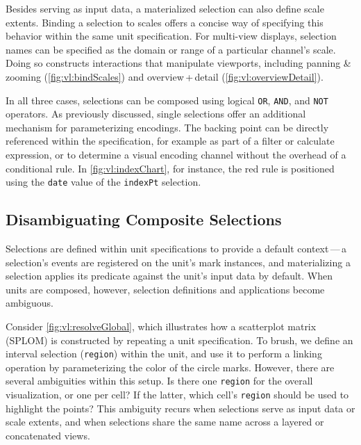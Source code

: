 Besides serving as input data, a materialized selection can also define scale
extents. Binding a selection to scales offers a concise way of specifying this
behavior within the same unit specification. For multi-view displays, selection
names can be specified as the domain or range of a particular channel's scale.
Doing so constructs interactions that manipulate viewports, including panning \&
zooming (\cref{fig:vl:bindScales}) and overview\,+\,detail
(\cref{fig:vl:overviewDetail}).

In all three cases, selections can be composed using logical \texttt{OR},
\texttt{AND}, and \texttt{NOT} operators. As previously discussed, single
selections offer an additional mechanism for parameterizing encodings. The
backing point can be directly referenced within the specification, for example
as part of a filter or calculate expression, or to determine a visual encoding
channel without the overhead of a conditional rule. In \cref{fig:vl:indexChart},
for instance, the red rule is positioned using the \texttt{date} value of the
\texttt{indexPt} selection.

\vspace{-10pt}

\subsection{Disambiguating Composite Selections}

\vspace{-7pt}

Selections are defined within unit specifications to provide a default
context\,---\,a selection's events are registered on the unit's mark instances,
and materializing a selection applies its predicate against the unit's input
data by default. When units are composed, however, selection definitions and
applications become ambiguous.

Consider \cref{fig:vl:resolveGlobal}, which illustrates how a scatterplot matrix
(SPLOM) is constructed by repeating a unit specification. To brush, we define an
interval selection (\texttt{region}) within the unit, and use it to perform a
linking operation by parameterizing the color of the circle marks. However,
there are several ambiguities within this setup. Is there one \texttt{region}
for the overall visualization, or one per cell? If the latter, which cell's
\texttt{region} should be used to highlight the points?  This ambiguity recurs
when selections serve as input data or scale extents, and when selections share
the same name across a layered or concatenated views.

